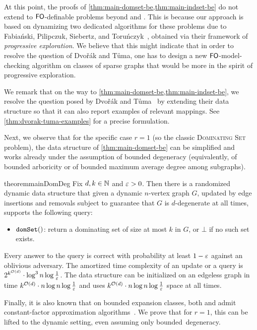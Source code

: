 At this point, the proofs of \cref{thm:main-domset-be,thm:main-indset-be} do not extend to $\mathsf{FO}$-definable problems beyond  and . This is because our approach is based on dynamizing two dedicated algorithms for these problems due to Fabia\'nski, Pilipczuk, Siebertz, and Toru\'nczyk~\cite{FabianskiPST19}, obtained via their framework of \emph{progressive exploration}. We believe that this might indicate that in order to resolve the question of Dvo\v{r}\'ak and T\r{u}ma, one has to design a new $\mathsf{FO}$-model-checking algorithm on classes of sparse graphs that would be more in the spirit of progressive exploration.

We remark that on the way to \cref{thm:main-domset-be,thm:main-indset-be}, we resolve the question posed by Dvo\v{r}\'ak and T\r{u}ma~\cite{DvorakT13} by extending their data structure so that it can also report examples of relevant mappings. See \cref{thm:dvorak-tuma-examples} for a precise formulation.

\medskip

Next, we observe that for the specific case $r=1$ (so the classic \textsc{Dominating Set} problem), the data structure of \cref{thm:main-domset-be} can be simplified and works already under the assumption of bounded degeneracy (equivalently, of bounded arboricity or of bounded maximum average degree among subgraphs).

\begin{restatable}{theorem}{mainDomDeg}\label{thm:main-domset-deg}
	Fix $d,k\in \mathbb{N}$ and $\varepsilon>0$. Then there is a randomized dynamic data structure that given a dynamic $n$-vertex graph $G$, updated by edge insertions and removals subject to guarantee that $G$ is $d$-degenerate at all times, supports the following query:
	\begin{itemize}
		\item $\mathtt{domSet}()$: return a dominating set of size at most $k$ in $G$, or $\bot$ if no such set exists.
	\end{itemize} 
	Every answer to the query is correct with probability at least $1-\varepsilon$ against an oblivious adversary.
	The amortized time complexity of an update or a query is $2^{k^{\mathcal{O}(d)}}\cdot \log^3 n \log \tfrac{1}{\varepsilon}$. The data structure can be initialized on an edgeless graph in time $k^{\mathcal{O}(d)}\cdot n\log n\log \tfrac{1}{\varepsilon}$ and uses  $k^{\mathcal{O}(d)}\cdot n\log n\log \tfrac{1}{\varepsilon}$ space at all times.
\end{restatable}

Finally, it is also known that on bounded expansion classes, both  and  admit constant-factor approximation algorithms~\cite{Dvorak13}. We prove that for $r=1$, this can be lifted to the dynamic setting, even assuming only bounded~degeneracy.

